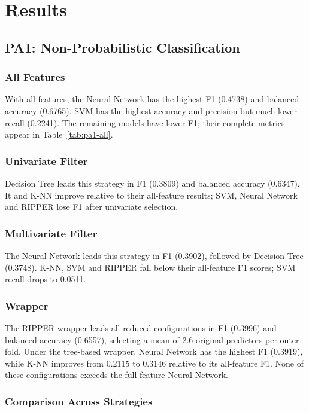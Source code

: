 \section{Results}

\subsection{PA1: Non-Probabilistic Classification}
\subsubsection{All Features}

With all features, the Neural Network has the highest F1 (0.4738) and balanced
accuracy (0.6765). SVM has the highest accuracy and precision but much lower
recall (0.2241). The remaining models have lower F1; their complete metrics
appear in Table~\ref{tab:pa1-all}.

\subsubsection{Univariate Filter}

Decision Tree leads this strategy in F1 (0.3809) and balanced accuracy (0.6347).
It and K-NN improve relative to their all-feature results; SVM, Neural Network
and RIPPER lose F1 after univariate selection.

\subsubsection{Multivariate Filter}

The Neural Network leads this strategy in F1 (0.3902), followed by Decision
Tree (0.3748). K-NN, SVM and RIPPER fall below their all-feature F1 scores;
SVM recall drops to 0.0511.

\subsubsection{Wrapper}

The RIPPER wrapper leads all reduced configurations in F1 (0.3996) and balanced
accuracy (0.6557), selecting a mean of 2.6 original predictors per outer fold.
Under the tree-based wrapper, Neural Network has the highest F1 (0.3919), while
K-NN improves from 0.2115 to 0.3146 relative to its all-feature F1. None of
these configurations exceeds the full-feature Neural Network.

\subsubsection{Comparison Across Strategies}

